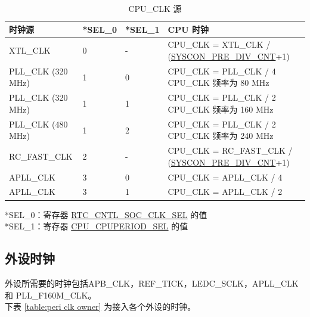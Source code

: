 \documentclass[main\_\_CN.tex]{subfiles}
\begin{document}
\begin{longtable}[c]{|l|l|l|m{10cm}|}
	\caption{CPU\_CLK 源}
    \label{table:cpu clk}
        \\\hline
        \rowcolor{lightgray}
        时钟源 & *SEL\_0 & *SEL\_1 & CPU 时钟 \\
        \hline
		XTL\_CLK & 0 & - & CPU\_CLK = XTL\_CLK / (\hyperref[fielddesc:SYSCONPREDIVCNT]{SYSCON\_PRE\_DIV\_CNT}+1)\\
        \hline
      PLL\_CLK (320 MHz) & 1  & 0 & CPU\_CLK = PLL\_CLK / 4 \newline
         		CPU\_CLK 频率为 80 MHz \\
        \hline
       PLL\_CLK (320 MHz) & 1  & 1  & CPU\_CLK = PLL\_CLK / 2 \newline
       			CPU\_CLK 频率为 160 MHz \\
        \hline
        PLL\_CLK (480 MHz) & 1 & 2 & CPU\_CLK = PLL\_CLK / 2 \newline
       			CPU\_CLK 频率为 240 MHz
       			\\\hline
       RC\_FAST\_CLK & 2  &  - & CPU\_CLK = RC\_FAST\_CLK / (\hyperref[fielddesc:SYSCONPREDIVCNT]{SYSCON\_PRE\_DIV\_CNT}+1)\\
        \hline
        APLL\_CLK & 3 & 0 & CPU\_CLK = APLL\_CLK / 4 \\
        \hline
        APLL\_CLK & 3 & 1 & CPU\_CLK = APLL\_CLK / 2 \\
        \hline
    \end{longtable}
    \vspace{-1em}
*SEL\_0：寄存器 \hyperref[regdesc:RTCCNTLSOCCLKSEL]{RTC\_CNTL\_SOC\_CLK\_SEL} 的值  \\
*SEL\_1：寄存器 \hyperref[fielddesc:CPUCPUPERIODSEL]{CPU\_CPUPERIOD\_SEL} 的值

\subsection{外设时钟}
外设所需要的时钟包括APB\_CLK，REF\_TICK，LEDC\_SCLK，APLL\_CLK 和 PLL\_F160M\_CLK。\\
下表 \ref{table:peri clk owner} 为接入各个外设的时钟。
\end{document}
